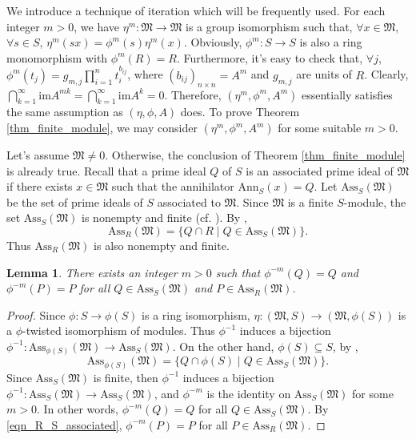 \documentclass[12pt]{amsart}
\theoremstyle{plain}
\newtheorem{lemma}[theorem]{Lemma}
\theoremstyle{definition}
\theoremstyle{question}
\theoremstyle{remark}
\theoremstyle{assumption}
\numberwithin{equation}{section}
\theoremstyle{bigthm}
\begin{document}
We introduce a technique of iteration which will be frequently used. For each integer $m>0$, we have $\eta^{m} \colon  \mathfrak{M} \rightarrow \mathfrak{M}$ is a group isomorphism such that, $\forall x \in \mathfrak{M}$, $\forall s \in S$, $\eta^{m} (sx) = \phi^{m} (s) \eta^{m} (x)$. Obviously, $\phi^{m} \colon  S \rightarrow S$ is also a ring monomorphism with $\phi^{m} (R) =R$. Furthermore, it's easy to check that, $\forall j$, $\phi^{m} (t_{j}) = g_{m,j} \prod_{i=1}^{n} t_{i}^{b_{ij}}$, where $(b_{ij})_{n \times n} = A^{m}$ and $g_{m,j}$ are units of $R$. Clearly, $\bigcap_{k=1}^{\infty} \mathrm{im} A^{mk} = \bigcap_{k=1}^{\infty} \mathrm{im} A^{k} =0$. Therefore, $(\eta^{m}, \phi^{m}, A^{m})$ essentially satisfies the same assumption as $(\eta, \phi, A)$ does. To prove Theorem \ref{thm_finite_module}, we may consider $(\eta^{m}, \phi^{m}, A^{m})$ for some suitable $m>0$.

Let's assume $\mathfrak{M} \neq 0$. Otherwise, the conclusion of Theorem \ref{thm_finite_module} is already true. Recall that a prime ideal $Q$ of $S$ is an associated prime ideal of $\mathfrak{M}$ if there exists $x \in \mathfrak{M}$ such that the annihilator $\mathrm{Ann}_{S} (x) = Q$. Let $\mathrm{Ass}_{S} (\mathfrak{M})$ be the set of prime ideals of $S$ associated to $\mathfrak{M}$. Since $\mathfrak{M}$ is a finite $S$-module, the set $\mathrm{Ass}_{S} (\mathfrak{M})$ is nonempty and finite (cf. \cite[(7.B)~\&~(7.G)]{Matsumura1}). By \cite[(9.A)]{Matsumura1},
\begin{equation}\label{eqn_R_S_associated}
\mathrm{Ass}_{R} (\mathfrak{M}) = \{ Q \cap R \mid Q \in \mathrm{Ass}_{S} (\mathfrak{M}) \}.
\end{equation}
Thus $\mathrm{Ass}_{R} (\mathfrak{M})$ is also nonempty and finite.

\begin{lemma}\label{lem_iteration}
There exists an integer $m>0$ such that $\phi^{-m} (Q) = Q$ and $\phi^{-m} (P) = P$ for all $Q \in \mathrm{Ass}_{S} (\mathfrak{M})$ and $P \in \mathrm{Ass}_{R} (\mathfrak{M})$.
\end{lemma}
\begin{proof}
Since $\phi \colon  S \rightarrow \phi (S)$ is a ring isomorphism, $\eta \colon  (\mathfrak{M}, S) \rightarrow (\mathfrak{M}, \phi (S))$ is a $\phi$-twisted isomorphism of modules. Thus $\phi^{-1}$ induces a bijection $\phi^{-1} \colon  \mathrm{Ass}_{\phi (S)} (\mathfrak{M}) \rightarrow \mathrm{Ass}_{S} (\mathfrak{M})$. On the other hand, $\phi (S) \subseteq S$, by \cite[(9.A)]{Matsumura1},
\[
\mathrm{Ass}_{\phi (S)} (\mathfrak{M}) = \{ Q \cap \phi (S) \mid Q \in \mathrm{Ass}_{S} (\mathfrak{M}) \}.
\]
Since $\mathrm{Ass}_{S} (\mathfrak{M})$ is finite, then $\phi^{-1}$ induces a bijection $\phi^{-1} \colon  \mathrm{Ass}_{S} (\mathfrak{M}) \rightarrow \mathrm{Ass}_{S} (\mathfrak{M})$, and $\phi^{-m}$ is the identity on $\mathrm{Ass}_{S} (\mathfrak{M})$ for some $m>0$. In other words, $\phi^{-m} (Q) = Q$ for all $Q \in \mathrm{Ass}_{S} (\mathfrak{M})$. By \eqref{eqn_R_S_associated}, $\phi^{-m} (P) = P$ for all $P \in \mathrm{Ass}_{R} (\mathfrak{M})$.
\end{proof}
\end{document}
